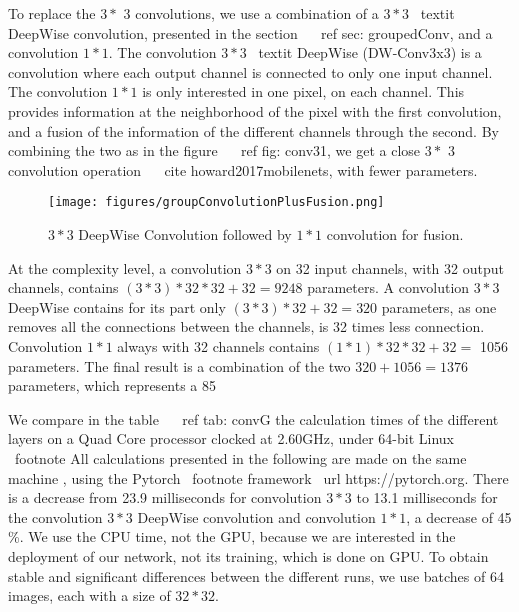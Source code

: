 \documentclass[letterpaper, 10 pt, conference]{ieeeconf}  %
\begin{document}
To replace the $ 3 * $ 3 convolutions, we use a combination of a $ 3 * 3 $ \ textit {DeepWise} convolution, presented in the section ~ \ ref {sec: groupedConv}, and a convolution $ 1 * 1 $.
The convolution $ 3 * 3 $ \ textit {DeepWise} (DW-Conv3x3) is a convolution where each output channel is connected to only one input channel.
The convolution $ 1 * 1 $ is only interested in one pixel, on each channel.
This provides information at the neighborhood of the pixel with the first convolution, and a fusion of the information of the different channels through the second.
By combining the two as in the figure ~ \ ref {fig: conv31}, we get a close $ 3 * $ 3 convolution operation ~ \ cite {howard2017mobilenets}, with fewer parameters.



\begin{figure}%
\texttt{[image: figures/groupConvolutionPlusFusion.png]}%
\caption{$3*3$ DeepWise Convolution followed by $1*1$ convolution for fusion.}%
\label{fig:conv31}%
\end{figure}

At the complexity level, a convolution $ 3 * 3 $ on 32 input channels, with 32 output channels, contains $ (3 * 3) * 32 * 32 + 32 = 9248 $ parameters.
A convolution $ 3 * 3 $ DeepWise contains for its part only $ (3 * 3) * 32 + 32 = 320 $ parameters, as one removes all the connections between the channels, is 32 times less connection.
Convolution $ 1 * 1 $ always with 32 channels contains $ (1 * 1) * 32 * 32 + 32 = $ 1056 parameters.
The final result is a combination of the two $ 320 + 1056 = 1376 $ parameters, which represents a 85%


We compare in the table ~ \ ref {tab: convG} the calculation times of the different layers on a Quad Core processor clocked at 2.60GHz, under 64-bit Linux \ footnote {All calculations presented in the following are made on the same machine }, using the Pytorch \ footnote framework {\ url {https://pytorch.org}}.
There is a decrease from 23.9 milliseconds for convolution $ 3 * 3 $ to 13.1 milliseconds for the convolution $ 3 * 3 $ DeepWise convolution and convolution $ 1 * 1 $, a decrease of 45 \%.
We use the CPU time, not the GPU, because we are interested in the deployment of our network, not its training, which is done on GPU.
To obtain stable and significant differences between the different runs, we use batches of 64 images, each with a size of $ 32 * 32 $.
\end{document}
